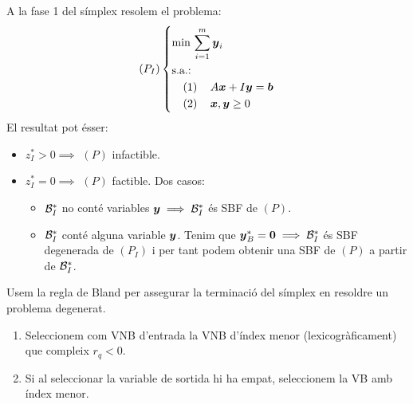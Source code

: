 \begin{obs}
    A la fase 1 del símplex resolem el problema:
    \begin{equation*}
        \lp P_I \rp \begin{dcases*}
            \min\, \sum_{i = 1}^m \vb{y}_i \\
            \text{s.a.: } \\
            \quad \left( 1 \right) \quad A\vb{x} + I\vb{y} = \vb{b} \\
            \quad \left( 2 \right) \quad \vb{x}, \vb{y} \geq 0 \\
        \end{dcases*}
    \end{equation*}
    El resultat pot ésser:
    \begin{itemize}
        \item $z_I^* > 0 \implies$ $\left(P\right)$ infactible.
        \item $z_I^* = 0 \implies$ $\left(P\right)$ factible. Dos casos:
            \begin{itemize}
                \item $\mathcal{B}_I^*$ no conté variables $\boldsymbol{y} \implies \mathcal{B}_I^*$ és SBF de $\left(P\right)$.
                \item $\mathcal{B}_I^*$ conté alguna variable $\boldsymbol{y}$. Tenim que $\boldsymbol{y}_B^* = \boldsymbol{0} \implies \mathcal{B}_I^*$ és SBF degenerada de $\left(P_I\right)$ i per tant podem obtenir una SBF de $\left(P\right)$ a partir de $\mathcal{B}_I^*$.
            \end{itemize}
    \end{itemize}
\end{obs}
\begin{rgl}[de Bland] \label{rgl:bland}
    Usem la regla de Bland per assegurar la terminació del símplex en resoldre 
    un problema degenerat.
    \begin{enumerate}
        \item Seleccionem com VNB d'entrada la VNB d'índex menor 
        (lexicogràficament) que compleix $r_q < 0$.
        \item Si al seleccionar la variable de sortida hi ha empat, seleccionem la VB amb índex menor.
    \end{enumerate}
\end{rgl}